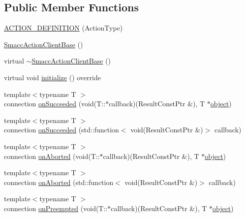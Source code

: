 \subsection*{Public Member Functions}
\begin{DoxyCompactItemize}
\item 
\hyperlink{classsmacc_1_1SmaccActionClientBase_ae244f5d079873d3563da832c4b430523}{A\+C\+T\+I\+O\+N\+\_\+\+D\+E\+F\+I\+N\+I\+T\+I\+ON} (Action\+Type)
\item 
\hyperlink{classsmacc_1_1SmaccActionClientBase_a1c3fa6bf380750b16f2ded87dd60860f}{Smacc\+Action\+Client\+Base} ()
\item 
virtual \hyperlink{classsmacc_1_1SmaccActionClientBase_a97241a2fa0bcbc6029f2749175623582}{$\sim$\+Smacc\+Action\+Client\+Base} ()
\item 
virtual void \hyperlink{classsmacc_1_1SmaccActionClientBase_a717b234a3e26ea778cce7635fb924e59}{initialize} () override
\item 
{\footnotesize template$<$typename T $>$ }\\connection \hyperlink{classsmacc_1_1SmaccActionClientBase_a2763202f0f75d0138978760aa434f9f9}{on\+Succeeded} (void(T\+::$\ast$callback)(Result\+Const\+Ptr \&), T $\ast$\hyperlink{classobject}{object})
\item 
{\footnotesize template$<$typename T $>$ }\\connection \hyperlink{classsmacc_1_1SmaccActionClientBase_a594eb41ba186940d54c1e163a66e3c5d}{on\+Succeeded} (std\+::function$<$ void(Result\+Const\+Ptr \&)$>$ callback)
\item 
{\footnotesize template$<$typename T $>$ }\\connection \hyperlink{classsmacc_1_1SmaccActionClientBase_aa7e6f12e9e2ff5749c35c3716a87cb14}{on\+Aborted} (void(T\+::$\ast$callback)(Result\+Const\+Ptr \&), T $\ast$\hyperlink{classobject}{object})
\item 
{\footnotesize template$<$typename T $>$ }\\connection \hyperlink{classsmacc_1_1SmaccActionClientBase_a19cc3c0b968646bdbbbb73974f050ecb}{on\+Aborted} (std\+::function$<$ void(Result\+Const\+Ptr \&)$>$ callback)
\item 
{\footnotesize template$<$typename T $>$ }\\connection \hyperlink{classsmacc_1_1SmaccActionClientBase_a9ae575716757722c401c825f773f08dd}{on\+Preempted} (void(T\+::$\ast$callback)(Result\+Const\+Ptr \&), T $\ast$\hyperlink{classobject}{object})
\item 

\end{DoxyCompactItemize}
